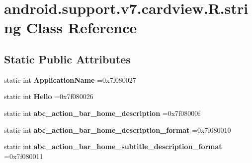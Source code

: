 \hypertarget{classandroid_1_1support_1_1v7_1_1cardview_1_1R_1_1string}{}\section{android.\+support.\+v7.\+cardview.\+R.\+string Class Reference}
\label{classandroid_1_1support_1_1v7_1_1cardview_1_1R_1_1string}
\subsection*{Static Public Attributes}
\begin{DoxyCompactItemize}
\item 
\mbox{\label{classandroid_1_1support_1_1v7_1_1cardview_1_1R_1_1string_a1f3a3e60d95493adf0d5c96373152486}} 
static int {\bfseries Application\+Name} =0x7f080027
\item 
\mbox{\label{classandroid_1_1support_1_1v7_1_1cardview_1_1R_1_1string_ab9a5141ff3cc0371739451de25df4d2d}} 
static int {\bfseries Hello} =0x7f080026
\item 
\mbox{\label{classandroid_1_1support_1_1v7_1_1cardview_1_1R_1_1string_a34534397c0e78742046aa6bff9a058dc}} 
static int {\bfseries abc\+\_\+action\+\_\+bar\+\_\+home\+\_\+description} =0x7f08000f
\item 
\mbox{\label{classandroid_1_1support_1_1v7_1_1cardview_1_1R_1_1string_a16d4481a96752c449d0adc3908461ae3}} 
static int {\bfseries abc\+\_\+action\+\_\+bar\+\_\+home\+\_\+description\+\_\+format} =0x7f080010
\item 
\mbox{\label{classandroid_1_1support_1_1v7_1_1cardview_1_1R_1_1string_a0be673c9cbe1b56a65d9b62fa0489e58}} 
static int {\bfseries abc\+\_\+action\+\_\+bar\+\_\+home\+\_\+subtitle\+\_\+description\+\_\+format} =0x7f080011
\item 
\mbox{\label{classandroid_1_1support_1_1v7_1_1cardview_1_1R_1_1string_a5e13773201fa5745400e25bb78f96133}} 

\end{DoxyCompactItemize}
